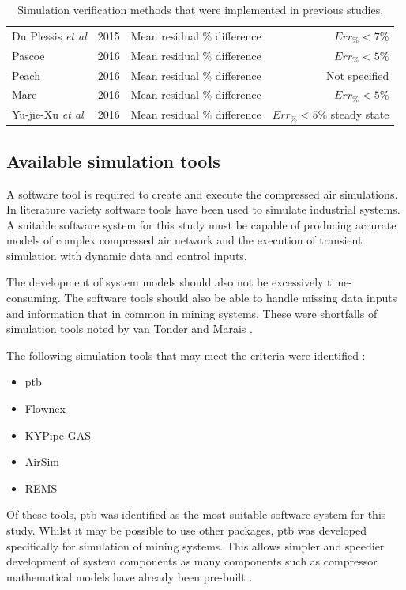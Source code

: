 \begin{table}[h]
\begin{tabular}{p{5cm}ccr}
 			Du Plessis \textit{et al}\cite{du2015development} 	& 2015 &  Mean residual \% difference &  $Err_{\%} <7\%$  \\
 			Pascoe \cite{Pascoe2016Masters} 					& 2016 &  Mean residual \% difference &  $Err_{\%} <5\%$  \\	
			Peach \cite{Peach2016Masters}						& 2016 &  Mean residual \% difference & Not specified\\
 			Mare \cite{Mare2016PhD} 							& 2016 &  Mean residual \% difference &  $Err_{\%} <5\%$   \\	
 			Yu-jie-Xu \textit{et al} \cite{xu2016modeling}		& 2016 &  Mean residual \% difference &  $Err_{\%} <5\%$ steady state \\
 			\hline
 		\end{tabular} 
 		\caption{Simulation verification methods that were implemented in previous studies.}
 		\label{table: Verification studies}
 	\end{table}
 
 	\subsection{Available simulation tools}
 	A software tool is required to create and execute the compressed air simulations. In literature variety software tools have been used to simulate industrial systems. A suitable software system for this study must be capable of producing accurate models of complex compressed air network and the execution of transient simulation with dynamic data and control inputs. 
 	\par 
 	The development of system models should also not be excessively time-consuming. The software tools should also be able to handle missing data inputs and information that in common in mining systems.  These were shortfalls of simulation tools noted by van Tonder \cite{vanTonder2014PhD} and Marais \cite{Mare2016PhD}.
	\par
 	  The following simulation tools that may meet the criteria were identified : 
 	\begin{itemize}
 		\item \gls{ptb}
 		\item Flownex
		\item KYPipe GAS
		\item AirSim
		\item REMS
 	\end{itemize}
 Of these tools, \gls{ptb} was identified as the most suitable software system for this study. Whilst it may be possible to use other packages, \gls{ptb} was developed specifically for simulation of mining systems. This allows simpler and speedier development of system components as many components such as compressor mathematical models have already been pre-built \cite{Mare2016PhD}. 
 
